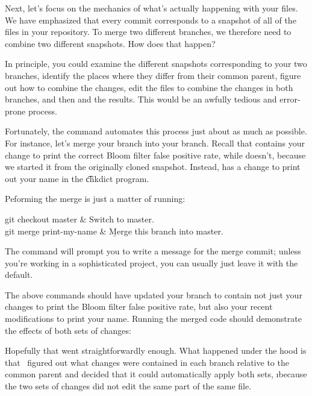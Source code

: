 \documentclass[letterpaper,12pt,titlepage,twoside]{article}
\begin{document}
Next, let's focus on the mechanics of what's actually happening with your
files. We have emphasized that every commit corresponds to a snapshot of all
of the files in your repository. To merge two different branches, we therefore
need to combine two different snapshots. How does that happen?

In principle, you could examine the different snapshots corresponding to your
two branches, identify the places where they differ from their common parent,
figure out how to combine the changes, edit the files to combine the changes
in both branches, and then  and  the results. This would
be an awfully tedious and error-prone process.

Fortunately, the  command automates this process just about as much
as possible. For instance, let's merge your  branch into your
 branch. Recall that  contains your change to print the
correct Bloom filter false positive rate, while  doesn't,
because we started it from the originally cloned snapshot. Instead,
 has a change to print out your name in the \t{chkdict}
program.

Peforming the merge is just a matter of running:

\begin{typeme}
git checkout master & Switch to master. \\
git merge print-my-name & \b{Merge this branch into master.} \\
\end{typeme}

The  command will prompt you to write a message for the merge
commit; unless you're working in a sophisticated project, you can usually just
leave it with the default.

The above commands should have updated your  branch to contain not
just your changes to print the Bloom filter false positive rate, but also your
recent modifications to print your name. Running the merged code should
demonstrate the effects of both sets of changes:


Hopefully that went straightforwardly enough. What happened under the hood is
that \git\ figured out what changes were contained in each branch relative to
the common parent and decided that it could automatically apply both sets,
\i{because the two sets of changes did not edit the same part of the same
  file}.
\end{document}

